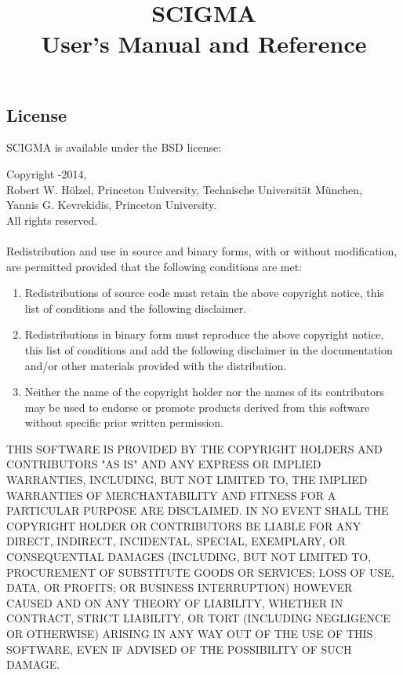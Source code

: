 \documentclass[10pt,a4paper,titlepage]{article}
\begin{document}
\title{{\huge{SCIGMA}}\\{\Large{User's Manual and Reference}}}
\maketitle
\subsection*{License}
SCIGMA is available under the BSD license:

Copyright -2014,\\
Robert W. H\"olzel, Princeton University, Technische Universit\"at M\"unchen,\\
Yannis G. Kevrekidis, Princeton University.\\
All rights reserved.\\\\
Redistribution and use in source and binary forms, with or without modification, are permitted provided that the following conditions are met:
\begin{enumerate}
\item{Redistributions of source code must retain the above copyright notice, this list of conditions and the following disclaimer.}
\item{Redistributions in binary form must reproduce the above copyright notice, this list of conditions and add the following disclaimer in the documentation and/or other materials provided with the distribution.}
\item{Neither the name of the copyright holder nor the names of its contributors may be used to endorse or promote products derived from this software without specific prior written permission.}
\end{enumerate}

THIS SOFTWARE IS PROVIDED BY THE COPYRIGHT HOLDERS AND CONTRIBUTORS "AS IS" AND ANY EXPRESS OR IMPLIED WARRANTIES, INCLUDING, BUT NOT LIMITED TO, THE IMPLIED WARRANTIES OF MERCHANTABILITY AND FITNESS FOR A PARTICULAR PURPOSE ARE DISCLAIMED. IN NO EVENT SHALL THE COPYRIGHT HOLDER OR CONTRIBUTORS BE LIABLE FOR ANY DIRECT, INDIRECT, INCIDENTAL, SPECIAL, EXEMPLARY, OR CONSEQUENTIAL DAMAGES (INCLUDING, BUT NOT LIMITED TO, PROCUREMENT OF SUBSTITUTE GOODS OR SERVICES; LOSS OF USE, DATA, OR PROFITS; OR BUSINESS INTERRUPTION) HOWEVER CAUSED AND ON ANY THEORY OF LIABILITY, WHETHER IN CONTRACT, STRICT LIABILITY, OR TORT (INCLUDING NEGLIGENCE OR OTHERWISE) ARISING IN ANY WAY OUT OF THE USE OF THIS SOFTWARE, EVEN IF ADVISED OF THE POSSIBILITY OF SUCH DAMAGE.
\end{document}

